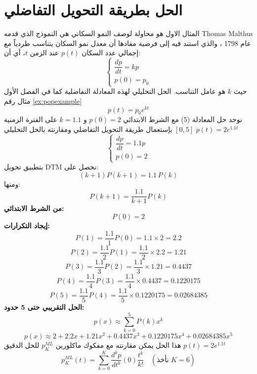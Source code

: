 \section*{الحل بطريقة التحويل التفاضلي}
\begin{example}
	المثال الاول هو محاولة لوصف النمو السكاني هي النموذج الذي قدمه Thomas Malthus عام 1798 \cite{malthus1798}، والذي استند فيه إلى فرضية مفادها أن معدل نمو السكان يتناسب طردياً مع إجمالي عدد السكان $p(t)$ عند الزمن $t$، أي أن:
	\begin{equation}
			\left\{
		\begin{array}{l}
			\dfrac{dp}{dt} = kp\\
			p(0) = p_0
		\end{array}
		\right.
	\end{equation}
	حيث $k$ هو عامل التناسب. الحل التحليلي لهذه المعادلة التفاضلية كما في الفصل الأول مثال
	رقم \ref{ex:popexample}
	\begin{equation}
		p(t) = p_0 e^{kt}
	\end{equation}
نوجد حل المعادلة (5) مع الشرط الابتدائي
$p(0)=2$ و $k=1.1$ على الفترة الزمنية $[0,5]$ بإستعمال طريقة التحويل التفاضلي ومقارنته بالحل التحليلي
$p(t) = 2 e^{1.1t}$
	\begin{equation}
		\left\{
		\begin{array}{l}
			\dfrac{dp}{dt} = 1.1p\\
			p(0) = 2
		\end{array}
		\right.
	\end{equation}
	بتطبيق تحويل DTM نحصل على:
	\[
	(k+1)P(k+1) = 1.1\,P(k)
	\]
	ومنها:
	\[
	P(k+1) = \frac{1.1}{k+1} P(k)
	\]
	\textbf{من الشرط الابتدائي:}
	\[
	P(0)=2
	\]
	\textbf{إيجاد التكرارات:}
	\[
	P(1) = \frac{1.1}{1}P(0) = 1.1 \times 2 = 2.2
	\]
	\[
	P(2) = \frac{1.1}{2}P(1) = \frac{1.1}{2} \times 2.2 = 1.21
	\]	
	\[
	P(3) = \frac{1.1}{3}P(2) = \frac{1.1}{3} \times 1.21 = 0.4437
	\]
	\[
	P(4) = \frac{1.1}{4}P(3) = \frac{1.1}{4} \times 0.4437 = 0.1220175
	\]
	\[
	P(5) = \frac{1.1}{5}P(4) = \frac{1.1}{5} \times 0.1220175 = 0.02684385
	\]
	\textbf{الحل التقريبي حتى 5 حدود:}
	\[
	p(x) \approx \sum_{k=0}^{5} P(k)x^k
	\]
	\[
	p(x) \approx 2 + 2.2x + 1.21x^2 + 0.4437x^3 + 0.1220175x^4 + 0.02684385x^5
	\]
هذا الحل يمكن مقارنته مع مفكوك ماكلورين 
$p_K^{ML}$ للحل الدقيق $p(t) = 2 e^{1.1 t}$
\[
p_K^{ML}(t) = \sum_{k=0}^{K} \frac{d^k p}{dt^k}(0) \frac{t^k}{k!} \quad (\text{نأخذ $K=6$}) 
\]
\end{example}

